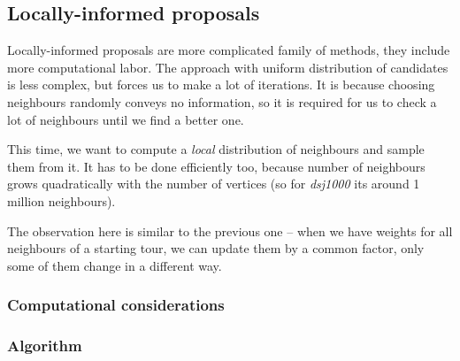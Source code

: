 \subsection{Locally-informed proposals}
	Locally-informed proposals are more complicated family of methods, they include more computational labor. The approach with uniform distribution of candidates is less complex, but forces us to make a lot of iterations. It is because choosing neighbours randomly conveys no information, so it is required for us to check a lot of neighbours until we find a better one. 
	
	This time, we want to compute a \textit{local} distribution of neighbours and sample them from it. It has to be done efficiently too, because number of neighbours grows quadratically with the number of vertices (so for \textit{dsj1000} its around 1 million neighbours).
	
	The observation here is similar to the previous one -- when we have weights for all neighbours of a starting tour, we can update them by a common factor, only some of them change in a different way.
	
	\subsubsection{Computational considerations}
	
	\subsubsection{Algorithm}